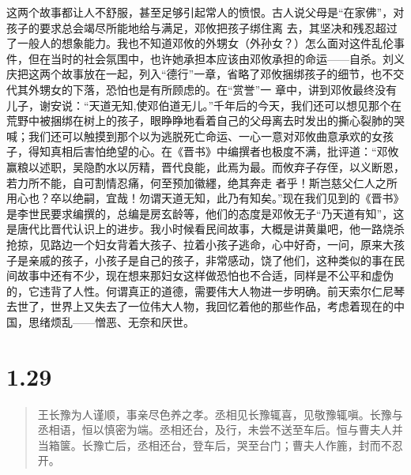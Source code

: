 \documentclass[]{book}
\begin{document}
这两个故事都让人不舒服，甚至足够引起常人的愤恨。古人说父母是``在家佛''，对孩子的要求总会竭尽所能地给与满足，邓攸把孩子绑住离
去，其坚决和残忍超过了一般人的想象能力。我也不知道邓攸的外甥女（外孙女？）怎么面对这件乱伦事件，但在当时的社会氛围中，也许她承担本应该由邓攸承担的命运------自杀。刘义庆把这两个故事放在一起，列入``德行''一章，省略了邓攸捆绑孩子的细节，也不交代其外甥女的下落，恐怕也是有所顾虑的。在``赏誉''一
章中，讲到邓攸最终没有儿子，谢安说：``天道无知,使邓伯道无儿。''千年后的今天，我们还可以想见那个在荒野中被捆绑在树上的孩子，眼睁睁地看着自己的父母离去时发出的撕心裂肺的哭喊；我们还可以触摸到那个以为逃脱死亡命运、一心一意对邓攸曲意承欢的女孩子，得知真相后害怕绝望的心。在《晋书》中编撰者也极度不满，批评道：``邓攸赢粮以述职，吴隐酌水以厉精，晋代良能，此焉为最。而攸弃子存侄，以义断恩，若力所不能，自可割情忍痛，何至预加徽纆，绝其奔走
者乎！斯岂慈父仁人之所用心也？卒以绝嗣，宜哉！勿谓天道无知，此乃有知矣。''现在我们见到的《晋书》是李世民要求编撰的，总编是房玄龄等，他们的态度是邓攸无子``乃天道有知''，这是唐代比晋代认识上的进步。我小时候看民间故事，大概是讲黄巢吧，他一路烧杀抢掠，见路边一个妇女背着大孩子、拉着小孩子逃命，心中好奇，一问，原来大孩子是亲戚的孩子，小孩子是自己的孩子，非常感动，饶了他们，这种类似的事在民间故事中还有不少，现在想来那妇女这样做恐怕也不合适，同样是不公平和虚伪的，它违背了人性。何谓真正的道德，需要伟大人物进一步明确。前天索尔仁尼琴去世了，世界上又失去了一位伟大人物，我回忆着他的那些作品，考虑着现在的中国，思绪烦乱------憎恶、无奈和厌世。

\section{1.29}\label{section-28}

\begin{quote}
王长豫为人谨顺，事亲尽色养之孝。丞相见长豫辄喜，见敬豫辄嗔。长豫与丞相语，恒以慎密为端。丞相还台，及行，未尝不送至车后。恒与曹夫人并当箱箧。长豫亡后，丞相还台，登车后，哭至台门；曹夫人作簏，封而不忍开。
\end{quote}
\end{document}
